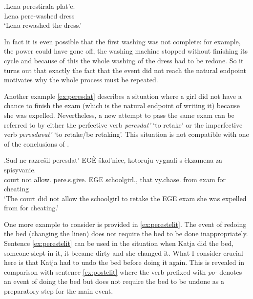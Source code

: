 \exg.\label{ex:perestirat}Lena perestirala plat'e.\\
Lena pere-washed dress\\
\trans `Lena rewashed the dress.'

In fact it is even possible that the first washing was not complete: for example, the power could have gone off, the washing machine stopped without finishing its cycle and because of this the whole washing of the dress had to be redone. So it turns out that exactly the fact that the event did not reach the natural endpoint motivates why the whole process must be repeated.

Another example \ref{ex:peresdat} describes a situation where a girl did not have a chance to finish the exam (which is the natural endpoint of writing it) because she was expelled. Nevertheless, a new attempt to pass the same exam can be referred to by either the perfective verb  \textit{peresdat'} `to retake' or the imperfective verb  \textit{peresdavat'} `to retake/be retaking'. This situation is not compatible with one of the conclusions of \citet{Kagan:book}.

\exg.\label{ex:peresdat}Sud ne razre\v{s}il peresdat' EG\`{E} \v{s}kol'nice, kotoruju vygnali s \`{e}kzamena za spisyvanie.\\
court not allow. pere.s.give. EGE schoolgirl., that vy.chase. from exam for cheating\\
\trans `The court did not allow the schoolgirl to retake the EGE exam she was expelled from for cheating.'

One more example to consider is provided in \ref{ex:perestelit}. The event of redoing the bed (changing the linen) does not require the bed to be done inappropriately. Sentence \ref{ex:perestelit} can be used in the situation when Katja did the bed, someone slept in it, it became dirty and she changed it. What I consider crucial here is that Katja had to undo the bed before doing it again. This is revealed in comparison  with sentence \ref{ex:postelit} where the verb prefixed with \textit{po-}   denotes an event of doing the bed but does not require the bed to be undone as a preparatory step for the main event. 

